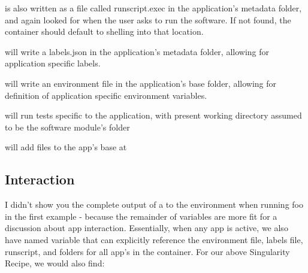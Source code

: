 \documentclass[letterpaper,10pt,english]{sphinxmanual}
\begin{document}
 is also written as a file called runscript.exec in the
application’s metadata folder, and again looked for when the user asks
to run the software. If not found, the container should default to
shelling into that location.

 will write a labels.json in the application’s metadata
folder, allowing for application specific labels.

 will write an environment file in the application’s base
folder, allowing for definition of application specific environment
variables.

 will run tests specific to the application, with present
working directory assumed to be the software module’s folder

 will add files to the app’s base at 


\subsection{Interaction}
\label{\detokenize{reproducible_scif_apps:interaction}}
I didn’t show you the complete output of a  to the environment when
running foo in the first example - because the remainder of variables
are more fit for a discussion about app interaction. Essentially, when
any app is active, we also have named variable that can explicitly
reference the environment file, labels file, runscript,  and  folders for
all app’s in the container. For our above Singularity Recipe, we would
also find:
\end{document}
